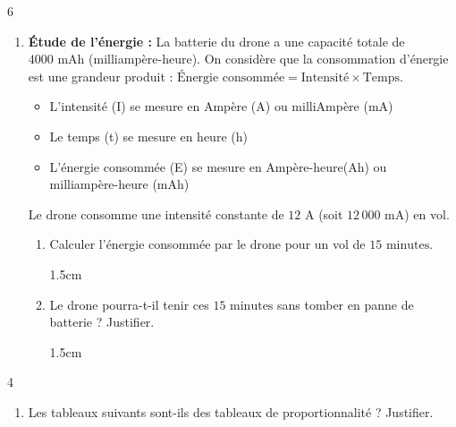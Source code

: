 \documentclass[a4paper]{book}
\begin{document}
{\begin{exerciceNote}{6}
\begin{enumerate}[leftmargin=*]
            \item \textbf{Étude de l'énergie :} 
           La batterie du drone a une capacité totale de $4000 \text{ mAh}$ (milliampère-heure). On considère que la consommation d'énergie est une grandeur produit : $\text{Énergie consommée} = \text{Intensité} \times \text{Temps}$.

            \begin{itemize}
               \item L'intensité (I) se mesure en Ampère (A) ou milliAmpère (mA)
               \item Le temps (t) se mesure en heure (h)
               \item L'énergie consommée (E) se mesure en Ampère-heure(Ah) ou milliampère-heure (mAh)
            \end{itemize}         
           
            Le drone consomme une intensité constante de $12 \text{ A}$ (soit $12\,000 \text{ mA}$) en vol.
            
            \begin{enumerate}[leftmargin=*]
                \item Calculer l'énergie consommée par le drone pour un vol de $15\text{ minutes}$.
                \begin{ZoneReponse}{1.5cm}                
                \end{ZoneReponse}
                
                \item Le drone pourra-t-il tenir ces $15\text{ minutes}$ sans tomber en panne de batterie ? Justifier.
                \begin{ZoneReponse}{1.5cm}                
                \end{ZoneReponse}
            \end{enumerate}              
        \end{enumerate}      
    \end{exerciceNote}


\newpage

\raggedright
\setcounter{exo}{0}
\NomPrenom
{}
\TableauCompetencesQuatre
            {\CompetenceSept}
            {}
            {}
            {}


    \begin{exerciceNote}{4}
        \begin{enumerate}[leftmargin=*]
            \item Les tableaux suivants sont-ils des tableaux de proportionnalité ? Justifier.
            

\end{enumerate}
\end{exerciceNote}}
\end{document}
